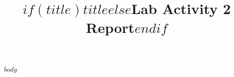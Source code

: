 \documentclass[11pt]{article}
\title{$if(title)$$title$$else$Lab Activity 2 Report$endif$}
\date{}
\begin{document}
\maketitle
$body$
\end{document}
